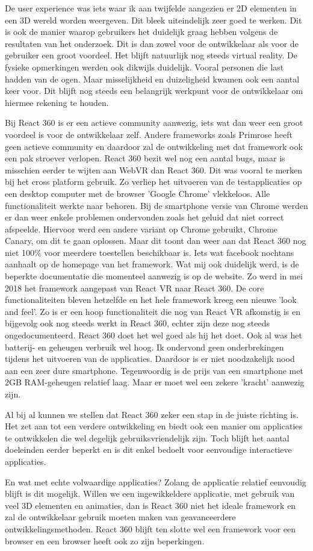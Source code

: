 De user experience was iets waar ik aan twijfelde aangezien er 2D elementen in een 3D wereld worden weergeven. Dit bleek uiteindelijk zeer goed te werken. Dit is ook de manier waarop gebruikers het duidelijk graag hebben volgens de resultaten van het onderzoek. Dit is dan zowel voor de ontwikkelaar als voor de gebruiker een groot voordeel. Het blijft natuurlijk nog steeds virtual reality. De fysieke opmerkingen werden ook dikwijls duidelijk. Vooral personen die last hadden van de ogen. Maar misselijkheid en duizeligheid kwamen ook een aantal keer voor. Dit blijft nog steeds een belangrijk werkpunt voor de ontwikkelaar om hiermee rekening te houden.

Bij React 360 is er een actieve community aanwezig, iets wat dan weer een groot voordeel is voor de ontwikkelaar zelf. Andere frameworks zoals Primrose heeft geen actieve community en daardoor zal de ontwikkeling met dat framework ook een pak stroever verlopen. React 360 bezit wel nog een  aantal bugs, maar is misschien eerder te wijten aan WebVR dan React 360. Dit was vooral te merken bij het cross platform gebruik. Zo verliep het uitvoeren van de testapplicaties op een desktop computer met de browser 'Google Chrome' vlekkeloos. Alle functionaliteit werkte naar behoren. Bij de smartphone versie van Chrome werden er dan weer enkele problemen ondervonden zoals het geluid dat niet correct afspeelde. Hiervoor werd een andere variant op Chrome gebruikt, Chrome Canary, om dit te gaan oplossen. Maar dit toont dan weer aan dat React 360 nog niet 100\% voor meerdere toestellen beschikbaar is. Iets wat facebook nochtans aanhaalt op de homepage van het framework. Wat mij ook duidelijk werd, is de beperkte documentatie die momenteel aanwezig is op de website. Zo werd in mei 2018 het framework aangepast van React VR naar React 360. De core functionaliteiten bleven hetzelfde en het hele framework kreeg een nieuwe 'look and feel'. Zo is er een hoop functionaliteit die nog van React VR afkomstig is en bijgevolg ook nog steeds werkt in React 360, echter zijn deze nog steeds ongedocumenteerd. React 360 doet het wel goed als hij het doet. Ook al was het batterij- en geheugen verbruik wel hoog. Ik ondervond geen onderbrekingen tijdens het uitvoeren van de applicaties. Daardoor is er niet noodzakelijk nood aan een zeer dure smartphone. Tegenwoordig is de prijs van een smartphone met 2GB RAM-geheugen relatief laag. Maar er moet wel een zekere 'kracht' aanwezig zijn.

Al bij al kunnen we stellen dat React 360 zeker een stap in de juiste richting is. Het zet aan tot een verdere ontwikkeling en biedt ook een manier om applicaties te ontwikkelen die wel degelijk gebruiksvriendelijk zijn. Toch blijft het aantal doeleinden eerder beperkt en is dit enkel bedoelt voor eenvoudige interactieve applicaties. 

En wat met echte volwaardige applicaties? Zolang de applicatie relatief eenvoudig blijft is dit mogelijk. Willen we een ingewikkeldere applicatie, met gebruik van veel 3D elementen en animaties, dan is React 360 niet het ideale framework en zal de ontwikkelaar gebruik moeten maken van geavanceerdere ontwikkelingsmethoden. React 360 blijft ten slotte wel een framework voor een browser en een browser heeft ook zo zijn beperkingen.
